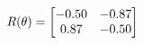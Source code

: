 \documentclass[preview]{standalone}
\begin{document}
\begin{align*}
\special{dvisvgm:raw <g id='unique000'>}R(\theta) = \begin{bmatrix}-0.50 & -0.87\\0.87 & -0.50\end{bmatrix}\special{dvisvgm:raw </g>}
\end{align*}
\end{document}
